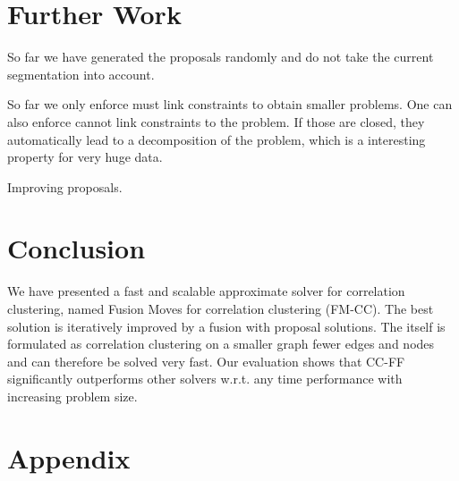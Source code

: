 \documentclass[10pt,twocolumn,letterpaper]{article}
\begin{document}
\section{Further Work}\label{sec:future}
So far we have generated the proposals randomly and do not take the current segmentation into account.

So far we only enforce must link constraints to obtain smaller problems.
One can also enforce cannot link constraints to the problem. 
If those are closed, they automatically lead to a decomposition of the problem, 
which is a interesting property for very huge data.

Improving proposals.




\section{Conclusion}\label{sec:conclusion}

We have presented a fast and scalable 
approximate solver for correlation 
clustering, named Fusion Moves for correlation clustering (FM-CC).
The best solution is iteratively improved 
by a fusion with proposal solutions.
The itself is formulated as correlation
clustering on a smaller graph fewer edges and nodes
and can therefore be solved very fast.
Our evaluation shows that CC-FF
significantly outperforms 
other solvers w.r.t. any time performance 
with increasing problem size.


    


\newpage

{\small


}

\newpage

\onecolumn
\section{Appendix}








\end{document}
